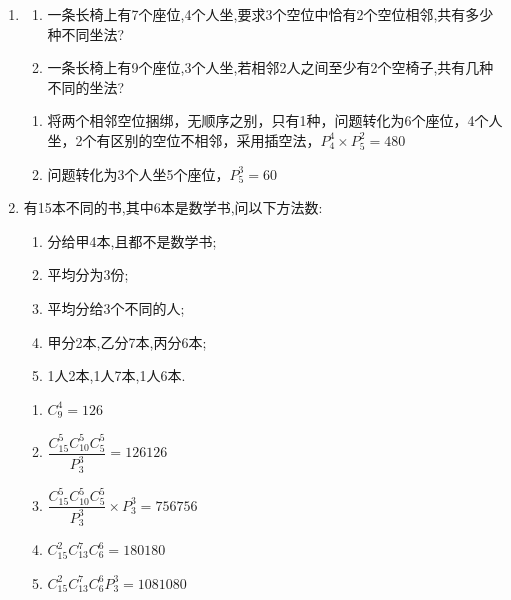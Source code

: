 \begin{enumerate}
\begin{jieda}
\begin{enumerate}
        再对小球分组，只有$(2,1,1)$一种

        再进行分配，相当于从3个盒子中选择1个放2个球，故$C _3^1 = 3$

        $4 \times 1 \times 3 = 12$
    \end{enumerate}
\end{jieda}

\item 
\begin{enumerate}
    \item 一条长椅上有7个座位,4个人坐,要求3个空位中恰有2个空位相邻,共有多少种不同坐法?
    \item 一条长椅上有9个座位,3个人坐,若相邻2人之间至少有2个空椅子,共有几种不同的坐法?
\end{enumerate}
\begin{jieda}
    \begin{enumerate}
        \item 将两个相邻空位捆绑，无顺序之别，只有1种，问题转化为6个座位，4个人坐，2个有区别的空位不相邻，采用插空法，$P_4^4 \times P_5^2 = 480$
        \item 问题转化为3个人坐5个座位，$P_5^3 = 60$
    \end{enumerate}
\end{jieda}

\item 有15本不同的书,其中6本是数学书,问以下方法数:
\begin{enumerate}
    \item 分给甲4本,且都不是数学书;
    \item 平均分为3份;
    \item 平均分给3个不同的人;
    \item 甲分2本,乙分7本,丙分6本;
    \item 1人2本,1人7本,1人6本.
\end{enumerate}
\begin{jieda}
    \begin{enumerate}
        \item $C_9^4 = 126$
        \item $\dfrac{C_{15}^5C_{10}^5C_5^5}{P_3^3} = 126126$
        \item $\dfrac{C_{15}^5C_{10}^5C_5^5}{P_3^3} \times P_3^3 = 756756$
        \item $C_{15}^2C_{13}^7C_6^6 = 180180$
        \item $C_{15}^2C_{13}^7C_6^6P_3^3 = 1081080$
    \end{enumerate}
\end{jieda}


\end{enumerate}
